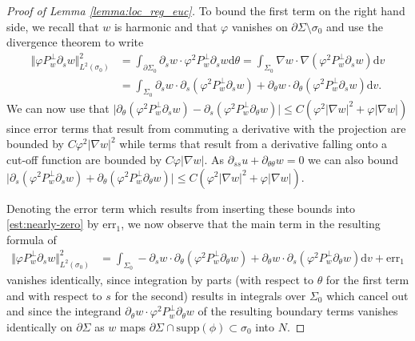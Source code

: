 \documentclass[10pt,reqno]{amsart}
\theoremstyle{plain}
\theoremstyle{definition}
\newcommand{\ptheta}{\partial_\theta}
\numberwithin{equation}{section}
\newcommand{\si}{\sigma}
\newcommand{\Si}{\Sigma}
\newcommand{\vph}{\varphi}
\newcommand{\vphi}{\varphi}
\newcommand{\norm}[1]{\Vert#1\Vert}
\newcommand{\beqa}{\begin{equation}\begin{aligned}}
\newcommand{\eeqa}{\end{aligned}\end{equation}}
\newcommand{\beqas}{\begin{equation*}\begin{aligned}}
\newcommand{\eeqas}{\end{aligned}\end{equation*}}
\newcommand{\dd}{\mathrm{d}} %
\newcommand{\abs}[1]{\vert#1\vert}
\newcommand{\na}{\nabla}
\newcommand{\pSi}{{\partial \Sigma}}
\newcommand{\supp}{\text{supp}}
\newcommand{\p}{\partial} %
\newcommand{\err}{\text{err}}
\begin{document}
\begin{proof}[Proof of Lemma \ref{lemma:loc_reg_euc}]
    To bound the first term on the right hand side, we recall that  $w$ is harmonic and that $\vphi$ vanishes on $\pSi\setminus \si_0$ and use the divergence theorem to write 
    \beqa\label{est:nearly-zero}
        \norm{\vph P_w^\perp\p_s w}_{L^2(\si_0)}^2 &= \int_{\p\Si_0}\p_s w \cdot \vph^2 P_w^\perp \p_s w \dd \theta = \int_{\Si_0}\nabla w \cdot \nabla (\vph^2 P_w^\perp \p_s w) \dd v\\
        &= \int_{\Si_0}\p_s w \cdot \p_s (\vph^2 P_w^\perp \p_s w) + \p_\theta w \cdot \p_\theta (\vph^2 P_w^\perp \p_s w) \dd v.
    \eeqa
    We can now use that $\abs{\p_\theta (\vph^2 P_w^\perp \p_s w) - \p_s (\vph^2 P_w^\perp \p_\theta w)}\leq C (\vphi^2\abs{\na w}^2 +\vphi\abs{\na w})$ since  error terms that result from commuting a derivative with the projection are bounded by $C\vphi^2\abs{\na w}^2$ while terms that result from a derivative falling onto a cut-off function are bounded by $C\vphi\abs{\na w}$. As $\p_{ss}u+\p_{\theta\theta} w=0$ we can also bound  $  \abs{\p_s (\vph^2 P_w^\perp \p_s w)+\p_\theta (\vph^2 P_w^\perp \p_\theta w)}\leq C (\vphi^2\abs{\na w}^2+\vphi\abs{\na w})$. 
        
    Denoting the error term which results from inserting these bounds into \eqref{est:nearly-zero} by $\err_1$, we now observe that the main term in the resulting formula of 
    \beqas       
        \norm{\vph P_w^\perp\p_s w}_{L^2(\si_0)}^2 
        &= \int_{\Si_0} -\p_s w \cdot  \p_\theta(\vph^2 P_w^\perp \p_{\theta} w ) + \p_\theta w \cdot  \p_s(\vph^2 P_w^\perp \p_{\theta} w) \dd v + \err_1
    \eeqas
    vanishes identically, since integration by parts (with respect to $\theta$ for the first term and with respect to $s$ for the second) results in integrals over $\Si_0$ which cancel out and since the integrand $\ptheta w \cdot \varphi^2 P_w^\perp \p_{\theta} w$ of the resulting boundary terms  vanishes identically on $\pSi$ as $w$ maps $\pSi\cap \supp(\phi)\subset \si_0$ into $N$.


\end{proof}
\end{document}
